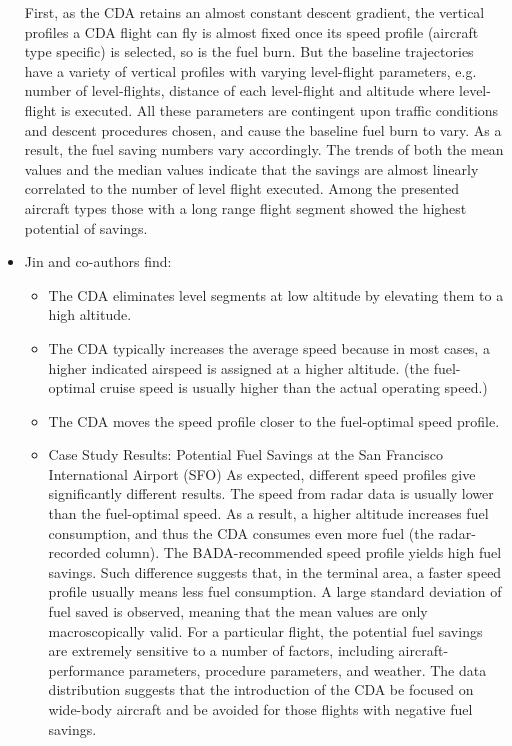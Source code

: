\documentclass{aer1315-pretty}
\begin{document}
\begin{itemize}
First, as the CDA retains an almost constant descent gradient, the vertical profiles a CDA flight can fly is almost fixed once its speed profile (aircraft type specific)
is selected, so is the fuel burn. But the baseline trajectories have a variety of vertical profiles with varying level-flight parameters, e.g. number of level-flights, distance of each level-flight and altitude where level-flight is executed. All these parameters are contingent upon traffic conditions and descent procedures chosen, and cause the baseline fuel burn to vary. As a result, the fuel saving numbers vary accordingly. The trends of both the mean values and the median values indicate that the savings are almost linearly correlated to the number of level flight executed. Among the presented aircraft types those with a long range flight segment showed the highest potential of savings. 


\item Jin and co-authors \cite{Jin:2013} find:
\begin{itemize}
\item The CDA eliminates level segments at low altitude by elevating them to a high altitude.
\item The CDA typically increases the average speed because in most cases, a higher indicated airspeed is assigned at a higher altitude. (the fuel-optimal cruise speed is usually higher than the actual operating speed.)
\item The CDA moves the speed profile closer to the fuel-optimal speed profile.
\item Case Study Results: Potential Fuel Savings at the San Francisco International Airport (SFO)
As expected, different speed profiles give significantly different results. The speed from radar data is usually lower than the fuel-optimal speed. As a result, a higher altitude increases fuel consumption, and thus the CDA consumes even more fuel (the radar-recorded column). The BADA-recommended speed profile yields high fuel
savings. Such difference suggests that, in the terminal area, a faster speed profile usually means less fuel consumption. A large standard deviation of fuel saved is observed, meaning that the mean values are only macroscopically valid. For a particular flight, the potential fuel savings are extremely sensitive to a number of factors, including aircraft-performance parameters, procedure parameters, and weather. The data distribution suggests that the introduction of the CDA be focused on wide-body aircraft and be avoided for those flights with negative fuel savings.
\end{itemize}


\end{itemize}
\end{document}
